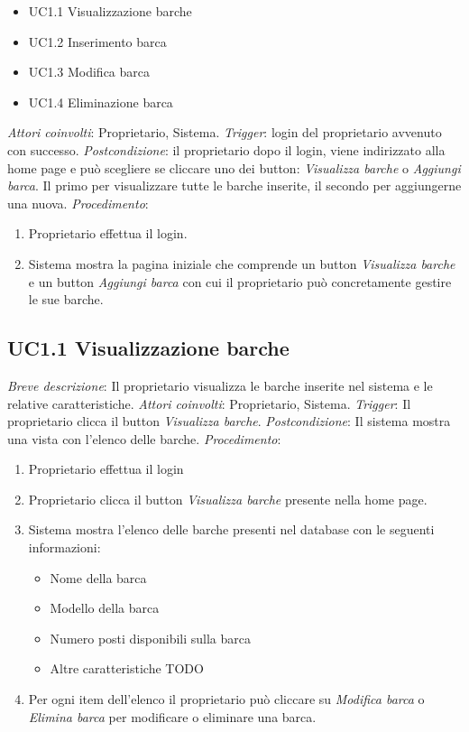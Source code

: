 \begin{itemize}
    \item UC1.1 Visualizzazione barche
    \item UC1.2 Inserimento barca
    \item UC1.3 Modifica barca
    \item UC1.4 Eliminazione barca
\end{itemize}

\noindent \emph{Attori coinvolti}: Proprietario, Sistema.\medbreak
\noindent \emph{Trigger}: login del proprietario avvenuto con successo.\medbreak
\noindent \emph{Postcondizione}: il proprietario dopo il login, viene indirizzato alla home page e può scegliere se cliccare uno dei button: \textit{Visualizza barche} o \textit{Aggiungi barca}. Il primo per visualizzare
tutte le barche inserite, il secondo per aggiungerne una nuova.\medbreak
\noindent \emph{Procedimento}:

\begin{enumerate}
    \item Proprietario effettua il login.
    \item Sistema mostra la pagina iniziale che comprende un button \textit{Visualizza barche} e un button \textit{Aggiungi barca} con cui il proprietario può concretamente gestire le sue barche.
\end{enumerate}

\subsection{UC1.1 Visualizzazione barche}

\noindent \emph{Breve descrizione}: Il proprietario visualizza le barche inserite nel sistema e le relative caratteristiche.\medbreak
\noindent \emph{Attori coinvolti}: Proprietario, Sistema.\medbreak
\noindent \emph{Trigger}: Il proprietario clicca il button \textit{Visualizza barche}.\medbreak
\noindent \emph{Postcondizione}: Il sistema mostra una vista con l'elenco delle barche.\medbreak
\noindent \emph{Procedimento}:

\begin{enumerate}
    \item Proprietario effettua il login
    \item Proprietario clicca il button \textit{Visualizza barche} presente nella home page.
    \item Sistema mostra l'elenco delle barche presenti nel database con le seguenti informazioni:
          \begin{itemize}
              \item Nome della barca
              \item Modello della barca
              \item Numero posti disponibili sulla barca
              \item Altre caratteristiche TODO
          \end{itemize}
    \item Per ogni item dell'elenco il proprietario può cliccare su \textit{Modifica barca} o \textit{Elimina barca} per modificare o eliminare una barca.
\end{enumerate}

